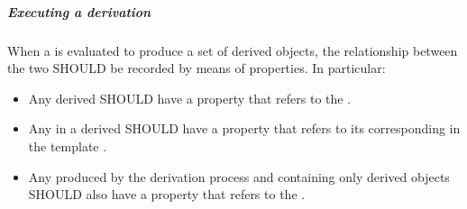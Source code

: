 \subparagraph{Executing a derivation}

When a  is evaluated to produce a set of derived  objects, the relationship between the two SHOULD be recorded by means of  properties. 
In particular:
\begin{itemize}
\item Any derived  SHOULD have a  property that refers to the . 
\item Any  in a derived  SHOULD have a  property that refers to its corresponding  in the template .
\item Any  produced by the derivation process and containing only derived  objects SHOULD also have a  property that refers to the .
\end{itemize}

